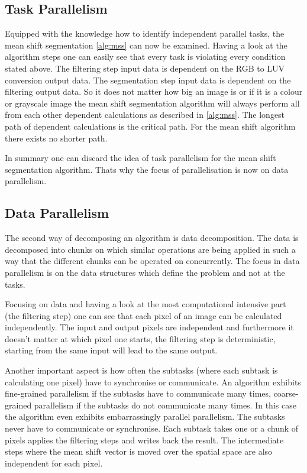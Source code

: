 \subsection{Task Parallelism} %
\label{sub:task_parallelism}

Equipped with the knowledge how to identify independent parallel tasks, the mean
shift segmentation \autoref{alg:mss} can now be examined. Having a
look at the algorithm steps one can easily see that every task is violating
every condition stated above. The filtering step input data is dependent on the
\gls{RGB} to \gls{LUV} conversion output data. The segmentation step input data
is dependent on the filtering output data. So it does not matter how big an
image is or if it is a colour or grayscale image the mean shift segmentation
algorithm will always perform all from each other dependent calculations as
described in \autoref{alg:mss}. The longest path of dependent calculations is
the critical path. For the mean shift algorithm there exists no shorter path.

In summary one can discard the idea of task parallelism for the mean shift
segmentation algorithm. Thats why the focus of parallelisation is now on data
parallelism. 


\subsection{Data Parallelism} %
\label{sub:data_parallelism}
The second way of decomposing an algorithm is data decomposition. The data is
decomposed into chunks on which similar operations are being applied in such a
way that the different chunks can be operated on concurrently. The focus in data
parallelism is on the data structures which define the problem and not at the
tasks.

Focusing on data and having a look at the most computational intensive part (the
filtering step) one can see that each pixel of an image can be calculated
independently. The input and output pixels are independent and furthermore it
doesn't matter at which pixel one starts, the filtering step is deterministic,
starting from the same input will lead to the same output.

Another important aspect is how often the subtasks (where each subtask is
calculating one pixel) have to synchronise or communicate. An algorithm exhibits
fine-grained parallelism if the subtasks have to communicate many times,
coarse-grained parallelism if the subtasks do not communicate many times. In
this case the algorithm even exhibits embarrassingly parallel parallelism. The
subtasks never have to communicate or synchronise. Each subtask takes one or a
chunk of pixels applies the filtering steps and writes back the result. The
intermediate steps where the mean shift vector is moved over the spatial space
are also independent for each pixel.

